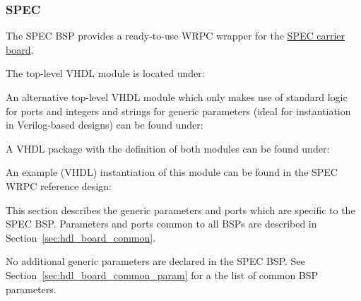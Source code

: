 \subsubsection{SPEC}
\label{sec:hdl_board_spec}

The SPEC BSP provides a ready-to-use WRPC wrapper for the
\href{http://www.ohwr.org/projects/spec}{SPEC carrier board}.

The top-level VHDL module is located under: \\

An alternative top-level VHDL module which only makes use of standard logic for ports and integers
and strings for generic parameters (ideal for instantiation in Verilog-based designs) can be found
under: \\

A VHDL package with the definition of both modules can be found under:
\\

An example (VHDL) instantiation of this module can be found in the SPEC WRPC reference design:
\\

This section describes the generic parameters and ports which are specific to the SPEC BSP.
Parameters and ports common to all BSPs are described in Section~\ref{sec:hdl_board_common}.


No additional generic parameters are declared in the SPEC BSP. See
Section~\ref{sec:hdl_board_common_param} for a the list of common BSP parameters.



